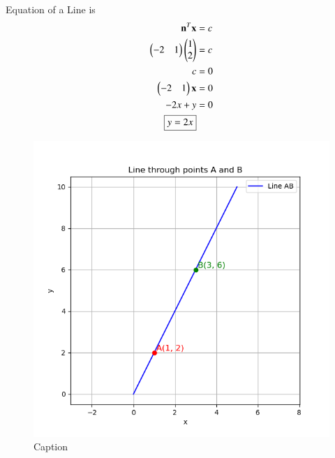 \documentclass[journal]{article}
\begin{document}
Equation of a Line is
\begin{align}
\mathbf{n}^T \mathbf{x} &= c \\
\begin{pmatrix}-2 & 1\end{pmatrix}\begin{pmatrix}1 \\ 2\end{pmatrix} &= c \\
c &= 0 \\
\begin{pmatrix}-2 & 1\end{pmatrix}\mathbf{x} &= 0 \\
-2x + y &= 0 \\
\boxed{y = 2x}
\end{align}
\newpage
\begin{figure}
    \centering
    \includegraphics[width=1.0\linewidth]{figs/fig1.png}
    \caption{Caption}
    \label{fig:placeholder}
\end{figure}
\end{document}
